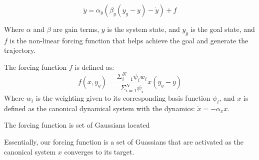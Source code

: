 \documentclass[10pt]{article}
\begin{document}
\begin{equation}
    \ddot{y} = \alpha_y(\beta_y(y_g-y) - \dot{y}) + f
\end{equation}

Where $\alpha$ and $\beta$ are gain terms, $y$ is the system state, and $y_g$ is the goal state, and $f$ is the non-linear forcing function that helps achieve the goal and generate the trajectory. 

The forcing function $f$ is defined as:
\begin{equation}
    f(x,y_g) = \frac{\Sigma_{i = 1}^{N} \psi_i w_i}{\Sigma_{i = 1}^{N} \psi_i}  x(y_g - y)
\end{equation}
Where $w_i$ is the weighting given to its corresponding basis function $\psi_i$, and $x$ is defined as the canonical dynamical system with the dynamics: $\dot{x} = - \alpha_x x$.

The forcing function is set of Gaussians located 

Essentially, our forcing function is a set of Guassians that are activated as the canonical system $x$ converges to its target.  
 
\end{document}
